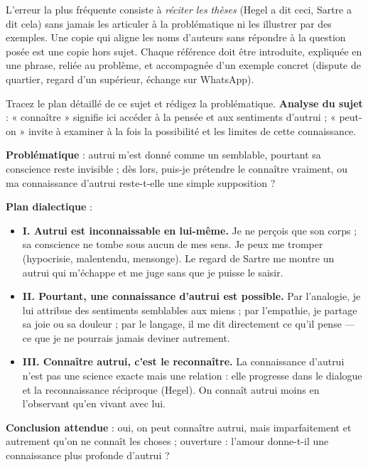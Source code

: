 \documentclass[11pt]{article}
\begin{document}
\begin{attention}
L'erreur la plus fréquente consiste à \emph{réciter les thèses} (Hegel a dit ceci, Sartre a dit cela) sans jamais les articuler à la problématique ni les illustrer par des exemples. Une copie qui aligne les noms d'auteurs sans répondre à la question posée est une copie hors sujet. Chaque référence doit être introduite, expliquée en une phrase, reliée au problème, et accompagnée d'un exemple concret (dispute de quartier, regard d'un supérieur, échange sur WhatsApp).
\end{attention}

\begin{exoresolu}
Tracez le plan détaillé de ce sujet et rédigez la problématique.
\tcblower
\textbf{Analyse du sujet} : « connaître » signifie ici accéder à la pensée et aux sentiments d'autrui ; « peut-on » invite à examiner à la fois la possibilité et les limites de cette connaissance.

\textbf{Problématique} : autrui m'est donné comme un semblable, pourtant sa conscience reste invisible ; dès lors, puis-je prétendre le connaître vraiment, ou ma connaissance d'autrui reste-t-elle une simple supposition ?

\textbf{Plan dialectique} :
\begin{itemize}
\item \textbf{I. Autrui est inconnaissable en lui-même.} Je ne perçois que son corps ; sa conscience ne tombe sous aucun de mes sens. Je peux me tromper (hypocrisie, malentendu, mensonge). Le regard de Sartre me montre un autrui qui m'échappe et me juge sans que je puisse le saisir.
\item \textbf{II. Pourtant, une connaissance d'autrui est possible.} Par l'analogie, je lui attribue des sentiments semblables aux miens ; par l'empathie, je partage sa joie ou sa douleur ; par le langage, il me dit directement ce qu'il pense — ce que je ne pourrais jamais deviner autrement.
\item \textbf{III. Connaître autrui, c'est le reconnaître.} La connaissance d'autrui n'est pas une science exacte mais une relation : elle progresse dans le dialogue et la reconnaissance réciproque (Hegel). On connaît autrui moins en l'observant qu'en vivant avec lui.
\end{itemize}
\textbf{Conclusion attendue} : oui, on peut connaître autrui, mais imparfaitement et autrement qu'on ne connaît les choses ; ouverture : l'amour donne-t-il une connaissance plus profonde d'autrui ?
\end{exoresolu}
\end{document}
